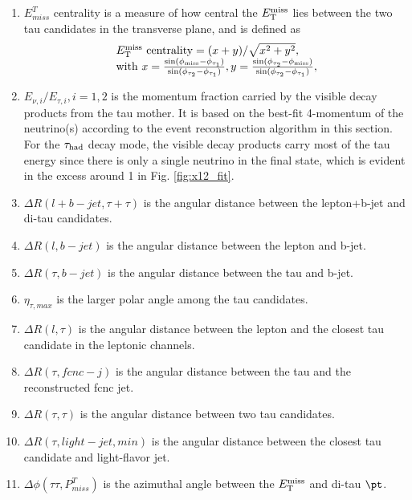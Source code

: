 \begin{enumerate}
\item $E^{T}_{miss}$ centrality is a measure of how central the $E_{\text{T}}^{\text{miss}}$ lies between the two tau candidates in the transverse plane, and is defined as
\begin{eqnarray}
\begin{array}{l}
E_{\text{T}}^{\text{miss}}~\text{centrality} = {(x+y)}/{\sqrt{x^2+y^2}}, \\
\text{with}~x=\frac{\sin(\phi_{\text{miss}}-\phi_{\tau_1})}{\sin(\phi_{\tau_2}-\phi_{\tau_1})},  y=\frac{\sin(\phi_{\tau_2}-\phi_{\text{miss}})}{\sin(\phi_{\tau_2}-\phi_{\tau_1})} ,
\end{array}
\label{eq:eq3}
\end{eqnarray}
\item $E_{\nu,i}/E_{\tau,i},i=1,2$ is the momentum fraction carried by the visible decay products from the tau mother. It is based on the best-fit 4-momentum of the neutrino(s) according to the event reconstruction algorithm in this section. For the $\tau_\text{had}$ decay mode, the visible decay products carry most of the tau energy since there is only a single neutrino in the final state, which is evident in the excess around 1 in Fig. \ref{fig:x12_fit}. 
\item $\Delta R(l+b-jet,\tau+\tau)$ is the angular distance between the lepton+b-jet and di-tau candidates.
\item $\Delta R(l,b-jet)$ is the angular distance between the lepton and b-jet.
\item $\Delta R(\tau,b-jet)$ is the angular distance between the tau and b-jet.
\item $\eta_{\tau,max}$ is the larger polar angle among the tau candidates.
\item $\Delta R(l,\tau)$ is the angular distance between the lepton and the closest tau candidate in the leptonic channels.
\item $\Delta R(\tau,fcnc-j)$ is the angular distance between the tau and the reconstructed fcnc jet.
\item $\Delta R(\tau,\tau)$ is the angular distance between two tau candidates.
\item $\Delta R(\tau,light-jet,min)$ is the angular distance between the closest tau candidate and light-flavor jet.
\item $\Delta\phi(\tau\tau,P^{T}_{miss})$ is the azimuthal angle between the $E_{\text{T}}^{\text{miss}}$ and di-tau $\pt$.

\end{enumerate}
